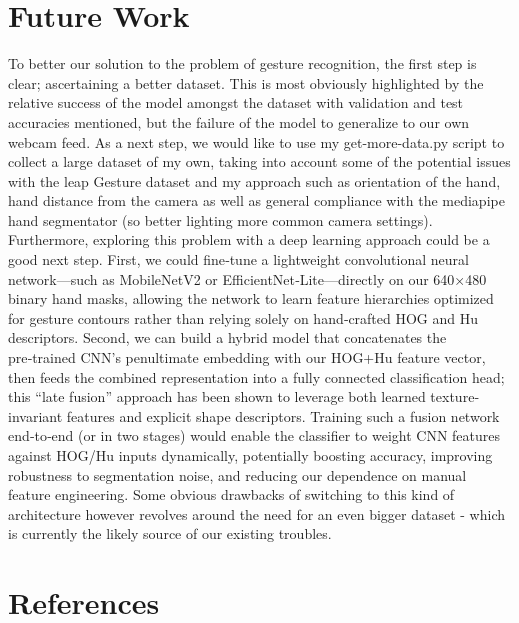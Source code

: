 \documentclass{article}
\begin{document}
\section{Future Work}
To better our solution to the problem of gesture recognition, the
first step is clear; ascertaining a better dataset. This is most
obviously highlighted by the relative success of the model amongst the dataset with
validation and test accuracies mentioned, but the failure of the model to generalize to our own webcam feed.
As a next step, we would like to use my get-more-data.py script to collect a large dataset of my own, taking into
account some of the potential issues with the leap Gesture dataset and my approach such as orientation of the hand,
hand distance from the camera as well as general compliance with the mediapipe hand segmentator (so better lighting more 
common camera settings). Furthermore, exploring this problem with a deep learning approach could be a good next step.
First, we could fine‑tune a lightweight convolutional neural network—such as MobileNetV2 or EfficientNet‑Lite—directly on our 640×480 binary hand masks, allowing the network to learn feature hierarchies optimized for gesture contours rather than relying solely on hand‑crafted HOG and Hu descriptors. Second, we can build a hybrid model that concatenates the pre‑trained CNN’s penultimate embedding with our HOG+Hu feature vector, then feeds the combined representation into a fully connected classification head; this “late fusion” approach has been shown to leverage both learned texture‐invariant features and explicit shape descriptors. Training such a fusion network end‑to‑end (or in two stages) would enable the classifier to weight CNN features against HOG/Hu inputs dynamically, potentially boosting accuracy, improving robustness to segmentation noise, and reducing our dependence on manual feature engineering.
Some obvious drawbacks of switching to this kind of architecture however revolves around the need for an even bigger dataset - which is currently the likely source of our existing troubles.


\section{References}


\end{document}
